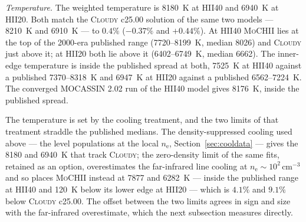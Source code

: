 \documentclass[twocolumn,linenumbers]{aastex702}
\newcommand{\MoCHII}{\textsc{MoCHII}}
\newcommand{\nelec}{n_{\mathrm{e}}}
\begin{document}
\emph{Temperature.}  The weighted temperature is 8180~K at HII40 and
6940~K at HII20.  Both match the \textsc{Cloudy} c25.00 solution of the
same two models --- 8210~K and 6910~K --- to $0.4\%$ ($-0.37\%$ and
$+0.44\%$).  At HII40 \MoCHII{} lies at the top of the 2000-era published
range (7720--8199~K, median 8026) and \textsc{Cloudy} just above it; at
HII20 both lie above it (6402--6749~K, median 6662).  The inner-edge
temperature is inside the published spread at both, 7525~K at HII40 against
a published 7370--8318~K and 6947~K at HII20 against a published
6562--7224~K.  The converged
MOCASSIN 2.02 run of the HII40 model gives 8176~K, inside the published
spread.

The temperature is set by the cooling treatment, and the two limits of that
treatment straddle the published medians.  The
density-suppressed cooling used above --- the level populations at the local
$\nelec$, Section~\ref{sec:cooldata} --- gives the 8180 and 6940~K that
track \textsc{Cloudy}; the zero-density limit of the same fits, retained as
an option, overestimates the far-infrared line cooling at
$\nelec \sim 10^{2}\,\mathrm{cm^{-3}}$ and so places \MoCHII{} instead at
7877 and 6282~K --- inside the published range at HII40 and 120~K below
its lower edge at HII20 --- which is $4.1\%$ and $9.1\%$ below
\textsc{Cloudy} c25.00.  The offset between the two limits agrees in
sign and size with the far-infrared overestimate, which the next subsection
measures directly.

\end{document}
